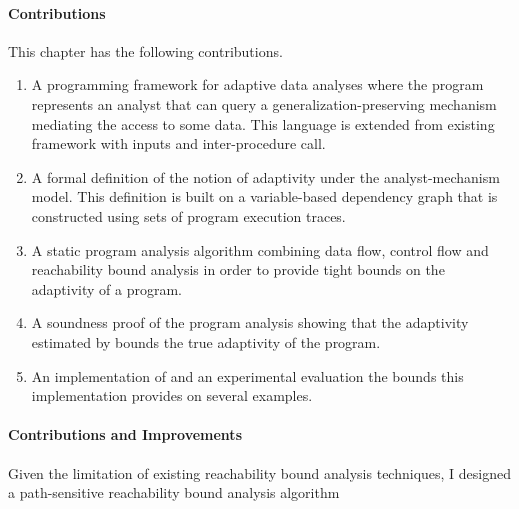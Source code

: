 \paragraph{Contributions}
This chapter has the following contributions.
\begin{enumerate}
   \item A programming framework for adaptive data analyses where the program represents an analyst that can query a generalization-preserving mechanism mediating the access to some data. 
   This language is extended from existing framework with inputs and inter-procedure call.
   \item 
   A formal definition of the notion of adaptivity under the analyst-mechanism model. 
   This definition is built on a variable-based dependency graph that is constructed using sets of program execution traces.
   \item 
   A static program analysis algorithm {\THESYSTEM} combining data flow, control flow and  reachability bound analysis in order to provide tight bounds on the adaptivity of a program. 
   \item A soundness proof of the program analysis showing that the adaptivity estimated by {\THESYSTEM} bounds the true adaptivity of the program. 
   \item An implementation of {\THESYSTEM} and an experimental evaluation the bounds this implementation provides on several examples.
\end{enumerate}
%
\paragraph*{Contributions and Improvements}
Given the limitation of existing reachability bound analysis techniques, I designed a path-sensitive reachability bound 
analysis algorithm

